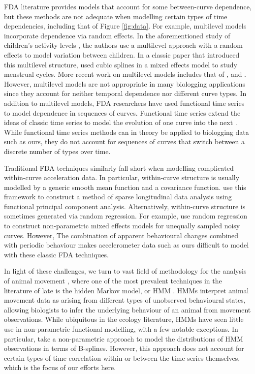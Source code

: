 FDA literature provides models that account for some between-curve dependence, but these methods are not adequate when modelling certain types of time dependencies, including that of Figure \ref{fig:data}. For example, multilevel models incorporate dependence via random effects. In the aforementioned study of children's activity levels \citep{Morris:2007}, the authors use a multilevel approach with a random effects to model variation between children. In a classic paper that introduced this multilevel structure,  \cite{Bromback:1998} used cubic splines in a mixed effects model to study menstrual cycles. More recent work on multilevel models includes that of \citet{Di:2009}, \citet{Chen:2012} and \citet{Crainiceanu:2009}. However, multilevel models are not appropriate in many biologging applications since they account for neither temporal dependence nor different curve types. 
In addition to multilevel models, FDA researchers have used functional time series to model dependence in sequences of curves. Functional time series extend the ideas of classic time series to model the evolution of one curve into the next \citep{Kokoszka:2018}. While functional time series methods can in theory be applied to biologging data such as ours, they do not account for sequences of curves that switch between a discrete number of types over time.
 
Traditional FDA techniques similarly fall short when modelling complicated within-curve acceleration data. In particular, within-curve structure is usually modelled by a generic smooth mean function and a covariance function. \citet{Yao:2005} use this framework to construct a method of sparse longitudinal data analysis using functional principal component analysis. Alternatively, within-curve structure is sometimes generated via random regression. For example, \citet{Rice:2001} use random regression to construct non-parametric mixed effects models for unequally sampled noisy curves. However, The combination of apparent behavioural changes combined with periodic behaviour makes accelerometer data such as ours difficult to model with these classic FDA techniques.

In light of these challenges, we turn to vast field of methodology for the analysis of animal movement \citep{Hooten:2017}, where one of the most prevalent techniques in the literature of late is the hidden Markov model, or HMM \citep{Patterson:2017,McClintock:2020}. HMMs interpret animal movement data as arising from different types of unobserved behavioural states, allowing biologists to infer the underlying behaviour of an animal from movement observations. While ubiquitous in the ecology literature, HMMs have seen little use in non-parametric functional modelling, with a few notable exceptions. In particular, \citet{Langrock:2018} take a non-parametric approach to model the distributions of HMM observations in terms of B-splines. 
However, this approach does not account for certain types of time correlation within or between the time series themselves, which is the focus of our efforts here.

